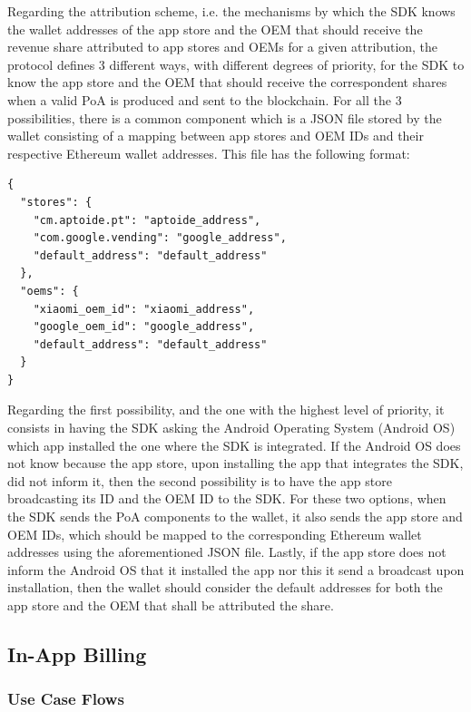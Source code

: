 Regarding the attribution scheme, i.e. the mechanisms by which the SDK knows the wallet addresses of the app store and the OEM that should receive the revenue share attributed to app stores and OEMs for a given attribution, the protocol defines 3 different ways, with different degrees of priority, for the SDK to know the app store and the OEM that should receive the correspondent shares when a valid \textsf{PoA} is produced and sent to the blockchain. For all the 3 possibilities, there is a common component which is a JSON file stored by the wallet consisting of a mapping between app stores and OEM IDs and their respective Ethereum wallet addresses. This file has the following format:
\begin{tcolorbox}[enhanced jigsaw,sharp corners, drop fuzzy shadow=ShadowColor]
\begin{lstlisting}
{
  "stores": {
    "cm.aptoide.pt": "aptoide_address",
    "com.google.vending": "google_address",
    "default_address": "default_address"
  },
  "oems": {
    "xiaomi_oem_id": "xiaomi_address",
    "google_oem_id": "google_address",
    "default_address": "default_address"
  }
}
\end{lstlisting}
\end{tcolorbox} 

Regarding the first possibility, and the one with the highest level of priority, it consists in having the SDK asking the Android Operating System (Android OS) which app installed the one where the SDK is integrated. If the Android OS does not know because the app store, upon installing the app that integrates the SDK, did not inform it, then the second possibility is to have the app store broadcasting its ID and the OEM ID to the SDK. For these two options, when the SDK sends the \textsf{PoA} components to the wallet, it also sends the app store and OEM IDs, which should be mapped to the corresponding Ethereum wallet addresses using the aforementioned JSON file. Lastly, if the app store does not inform the Android OS that it installed the app nor this it send a broadcast upon installation, then the wallet should consider the default addresses for both the app store and the OEM that shall be attributed the share. 


\subsection{In-App Billing}

\subsubsection{Use Case Flows}

